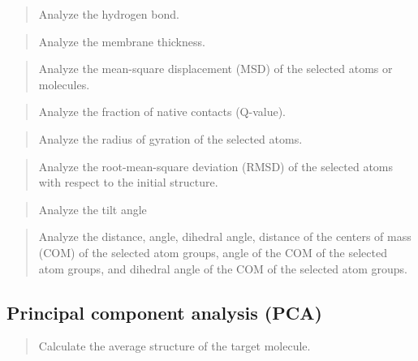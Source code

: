 \documentclass[a4paper,11pt,oneside,english]{sphinxmanual}
\begin{document}
\begin{quote}

Analyze the hydrogen bond.
\end{quote}

\begin{quote}

Analyze the membrane thickness.
\end{quote}

\begin{quote}

Analyze the mean-square displacement (MSD) of the selected atoms or molecules.
\end{quote}

\begin{quote}

Analyze the fraction of native contacts (Q-value).
\end{quote}

\begin{quote}

Analyze the radius of gyration of the selected atoms.
\end{quote}

\begin{quote}

Analyze the root-mean-square deviation (RMSD) of the selected atoms
with respect to the initial structure.
\end{quote}

\begin{quote}

Analyze the tilt angle
\end{quote}

\begin{quote}

Analyze the distance, angle, dihedral angle, distance of the centers of mass (COM)
of the selected atom groups, angle of the COM of the selected atom groups,
and dihedral angle of the COM of the selected atom groups.
\end{quote}


\subsection{Principal component analysis (PCA)}
\label{\detokenize{02_Available_Programs:principal-component-analysis-pca}}
\begin{quote}

Calculate the average structure of the target molecule.
\end{quote}
\end{document}

